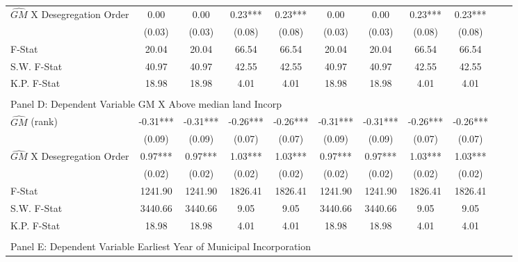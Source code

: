\begin{table}[htbp]
\begin{threeparttable}
\begin{tabular}{l*{10}{c}}
\addlinespace
$\hat{GM}$ X Desegregation Order&       0.00   &       0.00   &       0.23***&       0.23***&       0.00   &       0.00   &       0.23***&       0.23***\\
                &     (0.03)   &     (0.03)   &     (0.08)   &     (0.08)   &     (0.03)   &     (0.03)   &     (0.08)   &     (0.08)   \\
\midrule
F-Stat          &      20.04   &      20.04   &      66.54   &      66.54   &      20.04   &      20.04   &      66.54   &      66.54   \\
S.W. F-Stat     &      40.97   &      40.97   &      42.55   &      42.55   &      40.97   &      40.97   &      42.55   &      42.55   \\
K.P. F-Stat     &      18.98   &      18.98   &       4.01   &       4.01   &      18.98   &      18.98   &       4.01   &       4.01   \\
\cmidrule[\heavyrulewidth](lr){1-9} \\ \cmidrule[\heavyrulewidth](lr){1-9}
\multicolumn{8}{l}{Panel D: Dependent Variable GM X Above median land Incorp}\\
\cmidrule(lr){1-9}
$\hat{GM}$ (rank)&      -0.31***&      -0.31***&      -0.26***&      -0.26***&      -0.31***&      -0.31***&      -0.26***&      -0.26***\\
                &     (0.09)   &     (0.09)   &     (0.07)   &     (0.07)   &     (0.09)   &     (0.09)   &     (0.07)   &     (0.07)   \\
\addlinespace
$\hat{GM}$ X Desegregation Order&       0.97***&       0.97***&       1.03***&       1.03***&       0.97***&       0.97***&       1.03***&       1.03***\\
                &     (0.02)   &     (0.02)   &     (0.02)   &     (0.02)   &     (0.02)   &     (0.02)   &     (0.02)   &     (0.02)   \\
\midrule
F-Stat          &    1241.90   &    1241.90   &    1826.41   &    1826.41   &    1241.90   &    1241.90   &    1826.41   &    1826.41   \\
S.W. F-Stat     &    3440.66   &    3440.66   &       9.05   &       9.05   &    3440.66   &    3440.66   &       9.05   &       9.05   \\
K.P. F-Stat     &      18.98   &      18.98   &       4.01   &       4.01   &      18.98   &      18.98   &       4.01   &       4.01   \\
\cmidrule[\heavyrulewidth](lr){1-9} \\ \cmidrule[\heavyrulewidth](lr){1-9}
\multicolumn{8}{l}{Panel E: Dependent Variable Earliest Year of Municipal Incorporation}\\

\end{tabular}
\end{threeparttable}
\end{table}
